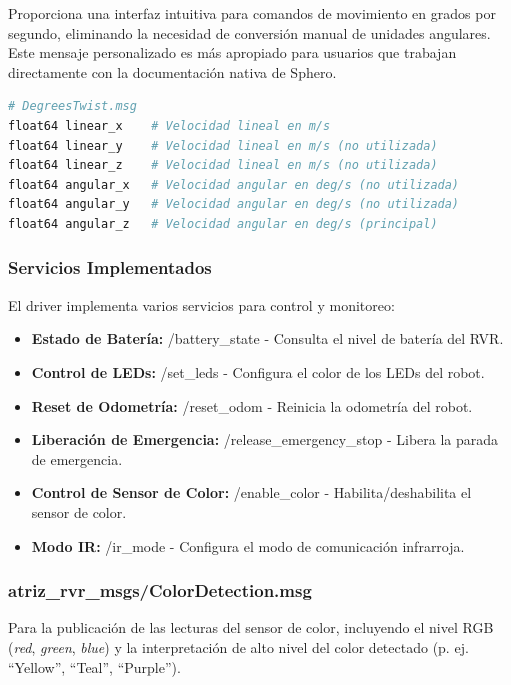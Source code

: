 \documentclass[11pt]{article}
\newcommand{\code}[1]{\textcolor{codeblue}{\url{#1}}}
\numberwithin{figure}{section}
\numberwithin{table}{section}
\def\code#1{#1}%
\begin{document}
Proporciona una interfaz intuitiva para comandos de movimiento en grados por segundo, eliminando la necesidad de conversión manual de unidades angulares. Este mensaje personalizado es más apropiado para usuarios que trabajan directamente con la documentación nativa de Sphero.

\begin{lstlisting}[language=bash]
# DegreesTwist.msg
float64 linear_x    # Velocidad lineal en m/s
float64 linear_y    # Velocidad lineal en m/s (no utilizada)
float64 linear_z    # Velocidad lineal en m/s (no utilizada)
float64 angular_x   # Velocidad angular en deg/s (no utilizada)
float64 angular_y   # Velocidad angular en deg/s (no utilizada)
float64 angular_z   # Velocidad angular en deg/s (principal)
\end{lstlisting}


\subsubsection{Servicios Implementados}

El driver implementa varios servicios para control y monitoreo:

\begin{itemize}
    \item \textbf{Estado de Batería:} \code{/battery\_state} - Consulta el nivel de batería del RVR.
    \item \textbf{Control de LEDs:} \code{/set\_leds} - Configura el color de los LEDs del robot.
    \item \textbf{Reset de Odometría:} \code{/reset\_odom} - Reinicia la odometría del robot.
    \item \textbf{Liberación de Emergencia:} \code{/release\_emergency\_stop} - Libera la parada de emergencia.
    \item \textbf{Control de Sensor de Color:} \code{/enable\_color} - Habilita/deshabilita el sensor de color.
    \item \textbf{Modo IR:} \code{/ir\_mode} - Configura el modo de comunicación infrarroja.
\end{itemize}


\subsubsection{atriz\_rvr\_msgs/ColorDetection.msg}

Para la publicación de las lecturas del sensor de color, incluyendo el nivel RGB (\textit{red}, \textit{green}, \textit{blue}) y la interpretación de alto nivel del color detectado (p. ej. ``Yellow'', ``Teal'', ``Purple'').
\end{document}
